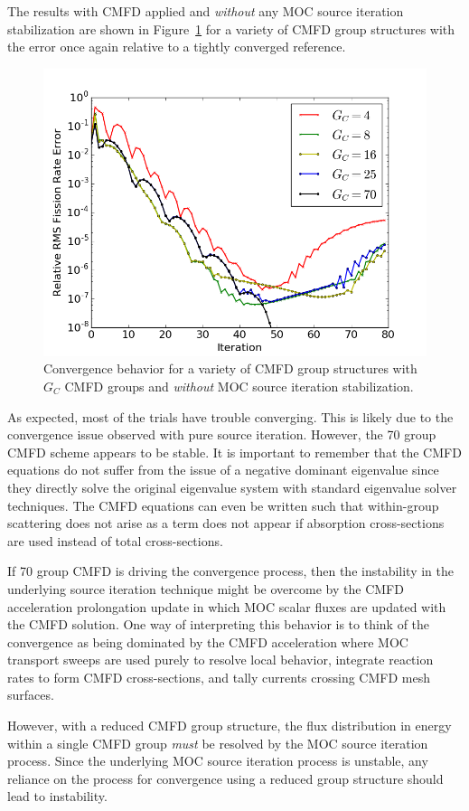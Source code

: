 The results with \ac{CMFD} applied and \textit{without} any \ac{MOC} source iteration stabilization are shown in Figure~\ref{fig:sa-cmfd-no-stab} for a variety of \ac{CMFD} group structures with the error once again relative to a tightly converged reference.
\begin{figure}[ht!]
	\centering
	\includegraphics[width=0.65\linewidth]{figures/convergence/sa_no_stab_cmfd.png}
	\caption{Convergence behavior for a variety of \ac{CMFD} group structures with $G_C$ \ac{CMFD} groups and \textit{without} \ac{MOC} source iteration stabilization.}
	\label{fig:sa-cmfd-no-stab}
\end{figure}
As expected, most of the trials have trouble converging. This is likely due to the convergence issue observed with pure source iteration. However, the 70 group \ac{CMFD} scheme appears to be stable. It is important to remember that the \ac{CMFD} equations do not suffer from the issue of a negative dominant eigenvalue since they directly solve the original eigenvalue system with standard eigenvalue solver techniques. The \ac{CMFD} equations can even be written such that within-group scattering does not arise as a term does not appear if absorption cross-sections are used instead of total cross-sections.

If 70 group \ac{CMFD} is driving the convergence process, then the instability in the underlying source iteration technique might be overcome by the \ac{CMFD} acceleration prolongation update in which \ac{MOC} scalar fluxes are updated with the \ac{CMFD} solution. One way of interpreting this behavior is to think of the convergence as being dominated by the \ac{CMFD} acceleration where \ac{MOC} transport sweeps are used purely to resolve local behavior, integrate reaction rates to form \ac{CMFD} cross-sections, and tally currents crossing \ac{CMFD} mesh surfaces. 

However, with a reduced \ac{CMFD} group structure, the flux distribution in energy within a single \ac{CMFD} group \textit{must} be resolved by the \ac{MOC} source iteration process. Since the underlying \ac{MOC} source iteration process is unstable, any reliance on the process for convergence using a reduced group structure should lead to instability.

